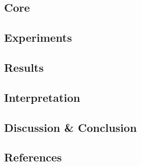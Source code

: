 \documentclass{article}
\begin{document}
\begin{multicols}{2}
\subsection*{Core}
\subsection*{Experiments}
\subsection*{Results}
\subsection*{Interpretation}

\subsection*{Discussion \& Conclusion}

\subsection*{References}
\end{multicols}
\newpage


\end{document}
